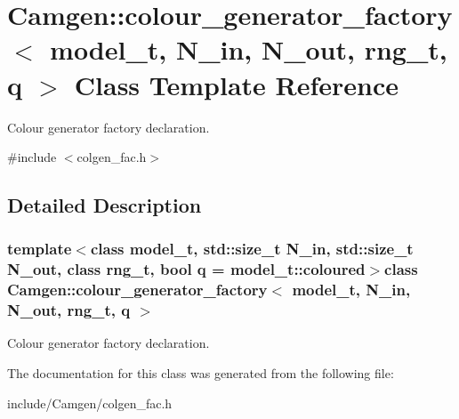 \hypertarget{a00085}{\section{Camgen\-:\-:colour\-\_\-generator\-\_\-factory$<$ model\-\_\-t, N\-\_\-in, N\-\_\-out, rng\-\_\-t, q $>$ Class Template Reference}
\label{a00085}
}


Colour generator factory declaration.  




{\ttfamily \#include $<$colgen\-\_\-fac.\-h$>$}



\subsection{Detailed Description}
\subsubsection*{template$<$class model\-\_\-t, std\-::size\-\_\-t N\-\_\-in, std\-::size\-\_\-t N\-\_\-out, class rng\-\_\-t, bool q = model\-\_\-t\-::coloured$>$class Camgen\-::colour\-\_\-generator\-\_\-factory$<$ model\-\_\-t, N\-\_\-in, N\-\_\-out, rng\-\_\-t, q $>$}

Colour generator factory declaration. 

The documentation for this class was generated from the following file\-:\begin{DoxyCompactItemize}
\item 
include/\-Camgen/colgen\-\_\-fac.\-h\end{DoxyCompactItemize}
